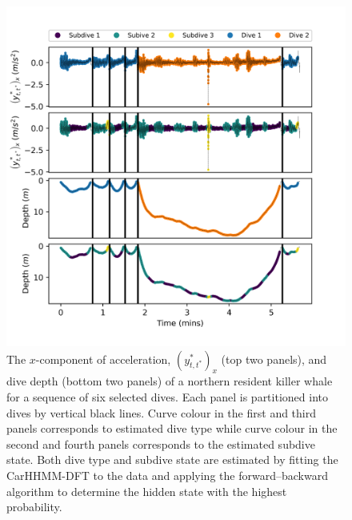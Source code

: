 \begin{figure}[ht]
	\centering
	\includegraphics[width=4.75in]{../Plots/2019/20190902-182840-CATs_OB_1_0_267_CarHHMM2_decoded_dives.png}
	\caption{The $x$-component of acceleration, $(y^*_{t,t^*})_x$ (top two panels), and dive depth (bottom two panels) of a northern resident killer whale for a sequence of six selected dives. Each panel is partitioned into dives by vertical black lines. Curve colour in the first and third panels corresponds to estimated dive type while curve colour in the second and fourth panels corresponds to the estimated subdive state. Both dive type and subdive state are estimated by fitting the CarHHMM-DFT to the data and applying the forward--backward algorithm to determine the hidden state with the highest probability.}
	\label{fig:labeled_dives}
\end{figure}

